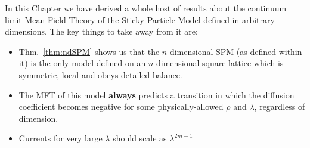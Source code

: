 In this Chapter we have derived a whole host of results about the continuum limit Mean-Field Theory
of the Sticky Particle Model defined in arbitrary dimensions. The key things to take away from it are:
\begin{itemize}
 \item Thm.~\ref{thm:ndSPM} shows us that the $n$-dimensional SPM (as defined within it) is the only
 model defined on an $n$-dimensional square lattice which is symmetric, local and obeys
 detailed balance.
 \item The MFT of this model \textbf{always} predicts a transition in which the diffusion coefficient
 becomes negative for some physically-allowed $\rho$ and $\lambda$, regardless of dimension.
 \item Currents for very large $\lambda$ should scale as $\lambda^{2m-1}$
\end{itemize}

